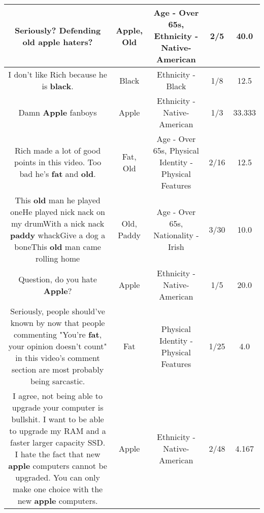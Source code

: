 \documentclass[11pt]{article}
\newlength\mylength
\begin{document}
\begin{center}
\begin{longtable}{|C{.65\mylength}|C{.30\mylength}|C{.12\mylength}|C{.12\mylength}|C{.12\mylength}|}
  \small Seriously? Defending \textbf{old} \textbf{apple} haters?\normalsize   & Apple, Old & Age - Over 65s, Ethnicity - Native-American & 2/5 & 40.0 \\  \hline
  \small I don't like Rich because he is \textbf{black}.\normalsize   & Black & Ethnicity - Black & 1/8 & 12.5 \\  \hline
  \small Damn \textbf{Apple} fanboys\normalsize   & Apple & Ethnicity - Native-American & 1/3 & 33.333 \\  \hline
  \small Rich made a lot of good points in this video. Too bad he's \textbf{fat} and \textbf{old}.\normalsize   & Fat, Old & Age - Over 65s, Physical Identity - Physical Features & 2/16 & 12.5 \\  \hline
  \small This \textbf{old} man he played oneHe played nick nack on my drumWith a nick nack \textbf{paddy} whackGive a dog a boneThis \textbf{old} man came rolling home\normalsize   & Old, Paddy & Age - Over 65s, Nationality - Irish & 3/30 & 10.0 \\  \hline
  \small Question, do you hate \textbf{Apple}?\normalsize   & Apple & Ethnicity - Native-American & 1/5 & 20.0 \\  \hline
  \small Seriously, people should've known by now that people commenting "You're \textbf{fat}, your opinion doesn't count" in this video's comment section are most probably being sarcastic.\normalsize   & Fat & Physical Identity - Physical Features & 1/25 & 4.0 \\  \hline
  \small I agree, not being able to upgrade your computer is bullshit. I want to be able to upgrade my RAM and a faster larger capacity SSD. I hate the fact that new \textbf{apple} computers cannot be upgraded. You can only make one choice with the new \textbf{apple} computers.\normalsize   & Apple & Ethnicity - Native-American & 2/48 & 4.167 \\  \hline

\end{longtable}
\end{center}
\end{document}
